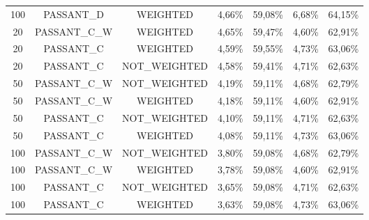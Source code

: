 \begin{table}[H]
{\begin{tabular}{ccccccc}
			100 &  PASSANT\_D &   WEIGHTED &     4,66\% &    59,08\% &     6,68\% &    64,15\% \\
			
			20 & PASSANT\_C\_W &   WEIGHTED &     4,65\% &    59,47\% &     4,60\% &    62,91\% \\
			
			20 &  PASSANT\_C &   WEIGHTED &     4,59\% &    59,55\% &     4,73\% &    63,06\% \\
			
			20 &  PASSANT\_C & NOT\_WEIGHTED &     4,58\% &    59,41\% &     4,71\% &    62,63\% \\
			
			50 & PASSANT\_C\_W & NOT\_WEIGHTED &     4,19\% &    59,11\% &     4,68\% &    62,79\% \\
			
			50 & PASSANT\_C\_W &   WEIGHTED &     4,18\% &    59,11\% &     4,60\% &    62,91\% \\
			
			50 &  PASSANT\_C & NOT\_WEIGHTED &     4,10\% &    59,11\% &     4,71\% &    62,63\% \\
			
			50 &  PASSANT\_C &   WEIGHTED &     4,08\% &    59,11\% &     4,73\% &    63,06\% \\
			
			100 & PASSANT\_C\_W & NOT\_WEIGHTED &     3,80\% &    59,08\% &     4,68\% &    62,79\% \\
			
			100 & PASSANT\_C\_W &   WEIGHTED &     3,78\% &    59,08\% &     4,60\% &    62,91\% \\
			
			100 &  PASSANT\_C & NOT\_WEIGHTED &     3,65\% &    59,08\% &     4,71\% &    62,63\% \\
			
			100 &  PASSANT\_C &   WEIGHTED &     3,63\% &    59,08\% &     4,73\% &    63,06\% \\
			
		\end{tabular}  
}
\end{table}

